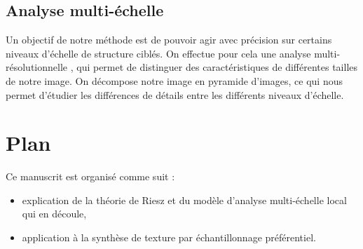 \subsection*{Analyse multi-échelle}

Un objectif de notre méthode est de pouvoir agir avec précision sur certains niveaux d'échelle de structure ciblés. On effectue pour cela une \og analyse multi-résolutionnelle \fg, qui permet de distinguer des caractéristiques de différentes tailles de notre image. On décompose notre image en pyramide d'images, ce qui nous permet d'étudier les différences de détails entre les différents niveaux d'échelle.

\section{Plan} %

Ce manuscrit est organisé comme suit :

\begin{itemize}
    \item explication de la théorie de Riesz et du modèle d'analyse multi-échelle local qui en découle,
    \item application à la synthèse de texture par échantillonnage préférentiel.
\end{itemize}